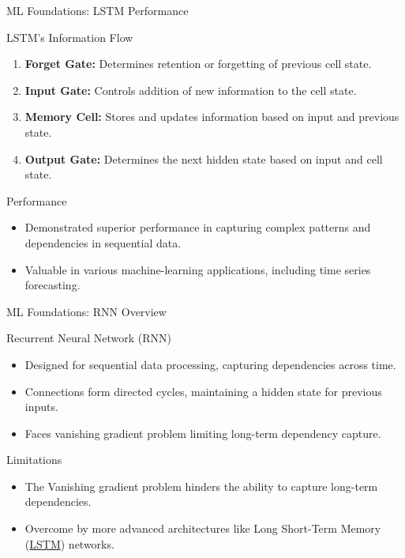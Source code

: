 \documentclass{beamer}
\begin{document}
\begin{frame}{ML Foundations: LSTM Performance}
    \begin{block}{LSTM's Information Flow}
        \begin{enumerate}
            \item \textbf{Forget Gate:} Determines retention or forgetting of previous cell state.
            \item \textbf{Input Gate:} Controls addition of new information to the cell state.
            \item \textbf{Memory Cell:} Stores and updates information based on input and previous state.
            \item \textbf{Output Gate:} Determines the next hidden state based on input and cell state.
        \end{enumerate}
    \end{block}

    \begin{block}{Performance}
        \begin{itemize}
            \item Demonstrated superior performance in capturing complex patterns and dependencies in sequential data.
            \item Valuable in various machine-learning applications, including time series forecasting.
        \end{itemize}
    \end{block}
\end{frame}

\begin{frame}{ML Foundations: RNN Overview}
    \begin{block}{Recurrent Neural Network (RNN)}\label{appx:rnn}
        \begin{itemize}
            \item Designed for sequential data processing, capturing dependencies across time.
            \item Connections form directed cycles, maintaining a hidden state for previous inputs.
            \item Faces vanishing gradient problem limiting long-term dependency capture.
        \end{itemize}
    \end{block}

    \begin{block}{Limitations}
        \begin{itemize}
            \item The Vanishing gradient problem hinders the ability to capture long-term dependencies.
            \item Overcome by more advanced architectures like Long Short-Term Memory (\hyperref[appx:lstm]{LSTM}) networks.
        \end{itemize}
    \end{block}
\end{frame}
\end{document}
